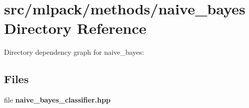 \section{src/mlpack/methods/naive\-\_\-bayes Directory Reference}
\label{dir_5d98aae30903f6af8a8ac6f033257133}
Directory dependency graph for naive\-\_\-bayes\-:
\subsection*{Files}
\begin{DoxyCompactItemize}
\item 
file {\bf naive\-\_\-bayes\-\_\-classifier.\-hpp}
\end{DoxyCompactItemize}
